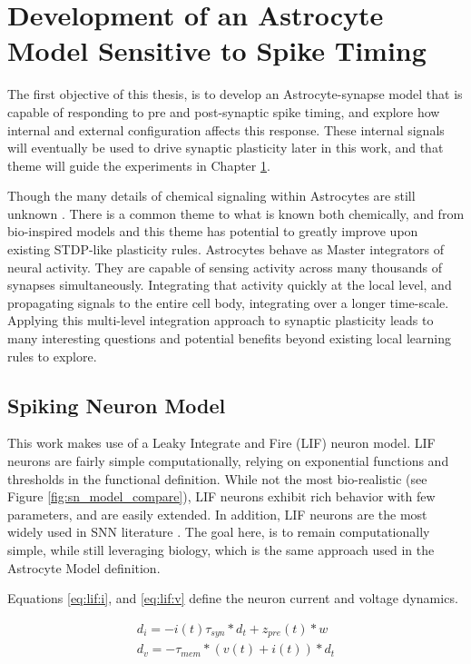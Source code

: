 %

\chapter{Development of an Astrocyte Model Sensitive to Spike Timing} \label{chapter:obj1}
The first objective of this thesis, is to develop an Astrocyte-synapse model
that is capable of responding to pre and post-synaptic spike timing, and
explore how internal and external configuration affects this response. These
internal signals will eventually be used to drive synaptic plasticity later in
this work, and that theme will guide the experiments in Chapter \ref{chapter:obj1}.

Though the many details of chemical signaling within Astrocytes are still unknown
\cite{manninen_2018}. There is a common theme to what is known both chemically,
and from bio-inspired models and this theme has potential to greatly improve upon
existing STDP-like plasticity rules. Astrocytes behave as Master integrators of
neural activity. They are capable of sensing activity across many thousands of
synapses simultaneously. Integrating that activity quickly at the local level,
and propagating signals to the entire cell body, integrating over a longer
time-scale. Applying this multi-level integration approach to synaptic
plasticity leads to many interesting questions and potential benefits beyond
existing local learning rules to explore.

\section{Spiking Neuron Model}
This work makes use of a Leaky Integrate and Fire (LIF) neuron model. LIF
neurons are fairly simple computationally, relying on exponential functions
and thresholds in the functional definition. While not the most
bio-realistic (see Figure \ref{fig:sn_model_compare}), LIF neurons exhibit
rich behavior with few parameters, and are easily extended. In addition, LIF
neurons are the most widely used in SNN literature \cite{ponulak_2011}. The
goal here, is to remain computationally simple, while still leveraging
biology, which is the same approach used in the Astrocyte Model definition.

Equations \ref{eq:lif:i}, and \ref{eq:lif:v} define the neuron current and
voltage dynamics.

\begin{align}
d_{i} = -i(t) \tau_{syn} * d_t + z_{pre}(t) * w \label{eq:lif:i} \\
d_{v} = -\tau_{mem} * (v(t) + i(t)) * d_t \label{eq:lif:v}
\end{align}

